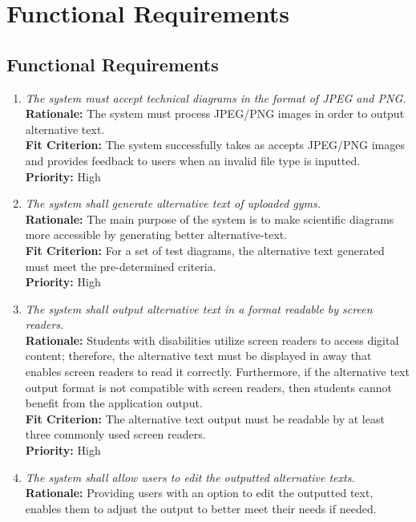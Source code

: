 \documentclass[12pt]{article}
\begin{document}
\section{Functional Requirements}
\subsection{Functional Requirements}
\begin{enumerate}[label=FR \arabic*., wide=0pt, leftmargin=*]
  \item \emph{The system must accept technical diagrams in the format of JPEG and PNG.}\\[2mm]
    {\bf Rationale:} The system must process JPEG/PNG images in order to output alternative text. \\
    {\bf Fit Criterion:} The system successfully takes as accepts JPEG/PNG images and provides feedback to users when an invalid file type is inputted.  \\
    {\bf Priority:} High
  \item \emph{The system shall generate alternative text of uploaded gyms.}\\[2mm]
    {\bf Rationale:} The main purpose of the system is to make scientific diagrams more accessible by generating better alternative-text. \\
    {\bf Fit Criterion:} For a set of test diagrams, the alternative text generated must meet the pre-determined criteria.\\
    {\bf Priority:} High
  \item \emph{The system shall output alternative text in a format readable by screen readers.}\\[2mm]
    {\bf Rationale:} Students with disabilities utilize screen readers to access digital content; therefore, the alternative text must be displayed in away that enables screen readers to read it correctly. Furthermore, if the alternative text output format is not compatible with screen readers, then students cannot benefit from the application output.\\
    {\bf Fit Criterion:} The alternative text output must be readable by at least three commonly used screen readers.\\
    {\bf Priority:} High
  \item \emph{The system shall allow users to edit the outputted alternative texts.}\\[2mm] 
    {\bf Rationale:} Providing users with an option to edit the outputted text, enables them to adjust the output to better meet their needs if needed.\\

\end{enumerate}
\end{document}
